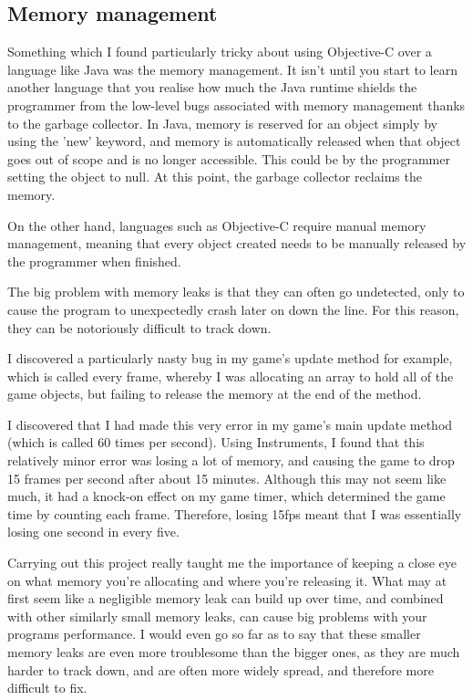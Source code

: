 \documentclass[a4paper,oneside]{report}
\begin{document}
\subsection{Memory management} 

Something which I found particularly tricky about using Objective-C over a language like Java was the memory management. It isn't until you start to learn another language that you realise how much the Java runtime shields the programmer from the low-level bugs associated with memory management thanks to the garbage collector. In Java, memory is reserved for an object simply by using the 'new' keyword, and memory is automatically released when that object goes out of scope and is no longer accessible. This could be by the programmer setting the object to null. At this point, the garbage collector reclaims the memory.

On the other hand, languages such as Objective-C  require manual memory management, meaning that every object created needs to be manually released by the programmer when finished. 

The big problem with memory leaks is that they can often go undetected, only to cause the program to unexpectedly crash later on down the line. For this reason, they can be notoriously difficult to track down. 

I discovered a particularly nasty bug in my game's update method for example, which is called every frame, whereby I was allocating an array to hold all of the game objects, but failing to release the memory at the end of the method. 

I discovered that I had made this very error in my game's main update method (which is called 60 times per second). Using Instruments, I found that this relatively minor error was losing a lot of memory, and causing the game to drop 15 frames per second after about 15 minutes. Although this may not seem like much, it had a knock-on effect on my game timer, which determined the game time by counting each frame. Therefore, losing 15fps meant that I was essentially losing one second in every five. 

Carrying out this project really taught me the importance of keeping a close eye on what memory you're allocating and where you're releasing it. What may at first seem like a negligible memory leak can build up over time, and combined with other similarly small memory leaks, can cause big problems with your programs performance. I would even go so far as to say that these smaller memory leaks are even more troublesome than the bigger ones, as they are much harder to track down, and are often more widely spread, and therefore more difficult to fix.
\end{document}
